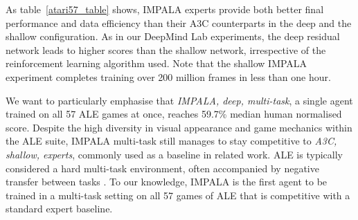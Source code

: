 As table~\ref{atari57_table} shows, IMPALA experts provide both better final performance and data efficiency than their A3C counterparts in the deep and the shallow configuration. As in our DeepMind Lab experiments, the deep residual network leads to higher scores than the shallow network, irrespective of the reinforcement learning algorithm used. Note that the shallow IMPALA experiment completes training over 200 million frames in less than one hour.

We want to particularly emphasise that \textit{IMPALA, deep, multi-task}, a single agent trained on all 57 ALE games at once, reaches 59.7\% median human normalised score. Despite the high diversity in visual appearance and game mechanics within the ALE suite, IMPALA multi-task still manages to stay competitive to \textit{A3C, shallow, experts}, commonly used as a baseline in related work. ALE is typically considered a hard multi-task environment, often accompanied by negative transfer between tasks \cite{rusu2016progressive}. To our knowledge, IMPALA is the first agent to be trained in a multi-task setting on all 57 games of ALE that is competitive with a standard expert baseline.


